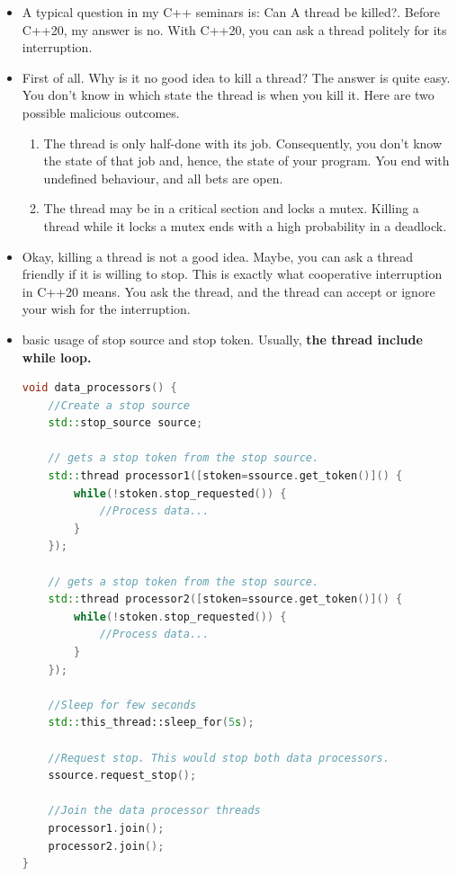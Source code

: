 \documentclass[a4paper,11pt,twoside]{book}
\begin{document}
\begin{itemize}
	\item A typical question in my C++ seminars is: Can A  thread be killed?. Before C++20, my answer is no. With C++20, you can ask a thread politely for its interruption.
	
	\item First of all. Why is it no good idea to kill a thread? The answer is quite easy. You don't know in which state the thread is when you kill it. Here are two possible malicious outcomes.
	\begin{enumerate}
		\item 	The thread is only half-done with its job. Consequently, you don't know the state of that job and, hence, the state of your program. You end with undefined behaviour, and all bets are open.
		
		\item 	The thread may be in a critical section and locks a mutex. Killing a thread while it locks a mutex ends with a high probability in a deadlock.
		
	\end{enumerate}
	
	\item Okay, killing a thread is not a good idea. Maybe, you can ask a thread friendly if it is willing to stop. This is exactly what cooperative interruption in C++20 means. You ask the thread, and the thread can accept or ignore your wish for the interruption.
	
	\item basic usage of stop source and stop token. Usually, \textbf{the thread include while loop. }
\begin{lstlisting}[frame=single, language=c++]	
void data_processors() {
	//Create a stop source
	std::stop_source source;
	
	// gets a stop token from the stop source.
	std::thread processor1([stoken=ssource.get_token()]() {
		while(!stoken.stop_requested()) {
			//Process data...
		}     
	});    

	// gets a stop token from the stop source.
	std::thread processor2([stoken=ssource.get_token()]() {
		while(!stoken.stop_requested()) {
			//Process data...
		}     
	});
	
	//Sleep for few seconds
	std::this_thread::sleep_for(5s);
	
	//Request stop. This would stop both data processors.
	ssource.request_stop();
	
	//Join the data processor threads
	processor1.join();
	processor2.join();
}
\end{lstlisting}


\end{itemize}
\end{document}
